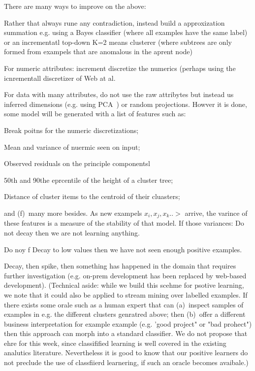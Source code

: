   There are many ways to improve on the above:
  \bi
\item Rather that always rune any contradiction,
instead build a approxization summation e.g. using a Bayes classifier (where all examples have the same label) or an incrementatl top-down K=2 means clusterer (where subtrees are only formed from exampels that are anomalous in the aprent node)
  \item
  For numeric attributes: increment discretize the numerics (perhaps using the icnrementall discretizer of Web at al.
  \item
  For data with many attributes, do not use the raw attribytes but instead us inferred dimensions (e.g. using PCA~\cite{}) or random projections.
  \ei
Howver it is done, some model will be generated with a list of features
such as:
\bi
\item
Break poitns for the numeric discretizations;  
\item
Mean and variance of nuermic seen on input; 
\item
Observed residuals on the principle componentsl 
\item
50th and 90the eprcentile of the  height of a cluster tree;  
\item Distance of cluster items to the centroid of their cluasters; 
\item and (f)~many more besides.
\ei
As new exampels $x_i,x_j,x_k..>$ arrive, the varince of these features is a 
measure of the stability of that model. If those variances:
\bi
\tem Do not decay then we are not learning anything.
\item
Do noy f Decay to low values then we have not seen enough positive examples. 
\item
Decay, then spike, then something has happened in the domain
that requires further investigation (e.g. on-prem development has been replaced by web-based development).
\ei
(Technical aside: while we build this scehme for psotive learning, we note
that it could also be applied to stream mining over labelled examples. If there exists some orale such as a human expert that can (a)~inspect  samples of examples in e.g. the different clusters genratred above;
then (b)~offer a different business interpretation for example example (e.g. 'good project" or "bad prohect") then this approach can morph into a standard classifier. We do not propose that ehre for this week, since classifified learning is well covered in the existing analutics literature. Nevertheless it is good to know that our positive learners do not preclude the use of classfiierd learnering, if such an oracle becomes avaibale.)

